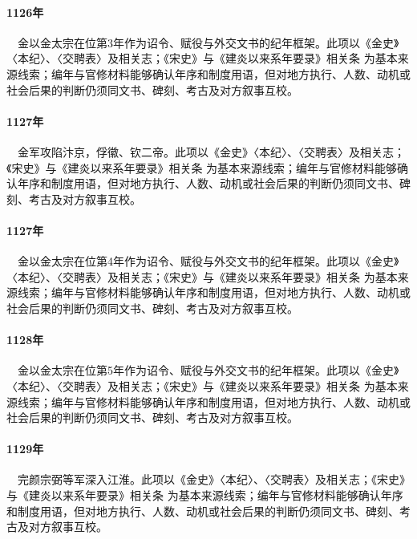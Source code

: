 \paragraph{1126年}　金以金太宗在位第3年作为诏令、赋役与外交文书的纪年框架。此项以《金史》〈本纪〉、〈交聘表〉及相关志；《宋史》与《建炎以来系年要录》相关条 为基本来源线索；编年与官修材料能够确认年序和制度用语，但对地方执行、人数、动机或社会后果的判断仍须同文书、碑刻、考古及对方叙事互校。

\paragraph{1127年}　金军攻陷汴京，俘徽、钦二帝。此项以《金史》〈本纪〉、〈交聘表〉及相关志；《宋史》与《建炎以来系年要录》相关条 为基本来源线索；编年与官修材料能够确认年序和制度用语，但对地方执行、人数、动机或社会后果的判断仍须同文书、碑刻、考古及对方叙事互校。

\paragraph{1127年}　金以金太宗在位第4年作为诏令、赋役与外交文书的纪年框架。此项以《金史》〈本纪〉、〈交聘表〉及相关志；《宋史》与《建炎以来系年要录》相关条 为基本来源线索；编年与官修材料能够确认年序和制度用语，但对地方执行、人数、动机或社会后果的判断仍须同文书、碑刻、考古及对方叙事互校。

\paragraph{1128年}　金以金太宗在位第5年作为诏令、赋役与外交文书的纪年框架。此项以《金史》〈本纪〉、〈交聘表〉及相关志；《宋史》与《建炎以来系年要录》相关条 为基本来源线索；编年与官修材料能够确认年序和制度用语，但对地方执行、人数、动机或社会后果的判断仍须同文书、碑刻、考古及对方叙事互校。

\paragraph{1129年}　完颜宗弼等军深入江淮。此项以《金史》〈本纪〉、〈交聘表〉及相关志；《宋史》与《建炎以来系年要录》相关条 为基本来源线索；编年与官修材料能够确认年序和制度用语，但对地方执行、人数、动机或社会后果的判断仍须同文书、碑刻、考古及对方叙事互校。

